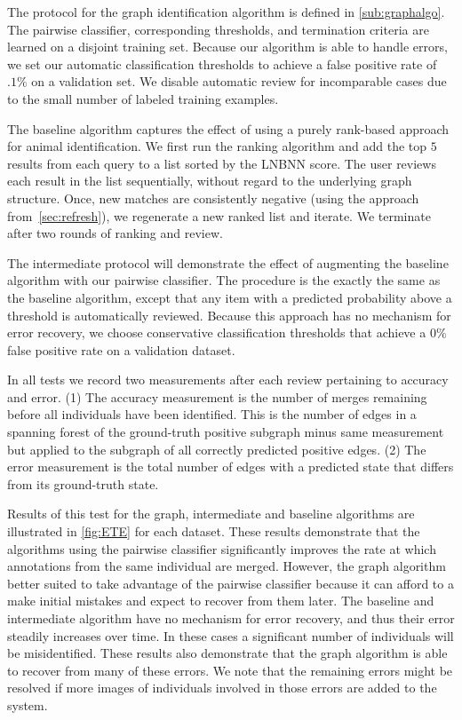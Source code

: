     The protocol for the graph identification algorithm is defined in \cref{sub:graphalgo}.
    The pairwise classifier, corresponding thresholds, and termination criteria are learned on a disjoint
      training set.
    Because our algorithm is able to handle errors, we set our automatic classification thresholds to achieve a
      false positive rate of $.1\percent$ on a validation set.
    We disable automatic review for incomparable cases due to the small number of labeled training examples.

    The baseline algorithm captures the effect of using a purely rank-based approach for animal identification.
    We first run the ranking algorithm and add the top $5$ results from each query to a list sorted by the LNBNN
      score.
    The user reviews each result in the list sequentially, without regard to the underlying graph structure.
    Once, new matches are consistently negative (using the approach from~\cref{sec:refresh}), we regenerate a new
      ranked list and iterate.
    We terminate after two rounds of ranking and review.

    The intermediate protocol will demonstrate the effect of augmenting the baseline algorithm with our pairwise
      classifier.
    The procedure is the exactly the same as the baseline algorithm, except that any item with a predicted
      probability above a threshold is automatically reviewed.
    Because this approach has no mechanism for error recovery, we choose conservative classification thresholds
      that achieve a $0\percent$ false positive rate on a validation dataset.

    In all tests we record two measurements after each review pertaining to accuracy and error.
    (1) The accuracy measurement is the number of merges remaining before all individuals have been identified.
    This is the number of edges in a spanning forest of the ground-truth positive subgraph minus same measurement
      but applied to the subgraph of all correctly predicted positive edges.
    (2) The error measurement is the total number of edges with a predicted state that differs from its
      ground-truth state.

    Results of this test for the graph, intermediate and baseline algorithms are illustrated in \cref{fig:ETE}
      for each dataset.
    These results demonstrate that the algorithms using the pairwise classifier significantly improves the rate
      at which annotations from the same individual are merged.
    However, the graph algorithm better suited to take advantage of the pairwise classifier because it can afford
      to a make initial mistakes and expect to recover from them later.
    The baseline and intermediate algorithm have no mechanism for error recovery, and thus their error steadily
      increases over time.
    In these cases a significant number of individuals will be misidentified.
    These results also demonstrate that the graph algorithm is able to recover from many of these errors.
    We note that the remaining errors might be resolved if more images of individuals involved in those errors
      are added to the system.

